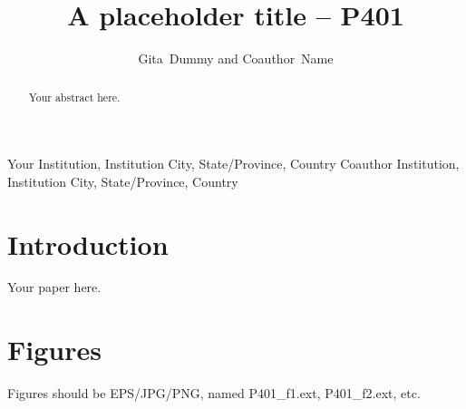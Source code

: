 \documentclass[11pt,twoside]{article}
\begin{document}
\title{A placeholder title -- P401}

\author{Gita~Dummy and Coauthor~Name}
Your Institution, Institution City, State/Province, Country
Coauthor Institution, Institution City, State/Province, Country



\begin{abstract}
Your abstract here.
\end{abstract}

\section{Introduction}

Your paper here.

\section{Figures}

Figures should be EPS/JPG/PNG, named P401\_f1.ext, P401\_f2.ext, etc.

% 
\end{document}
